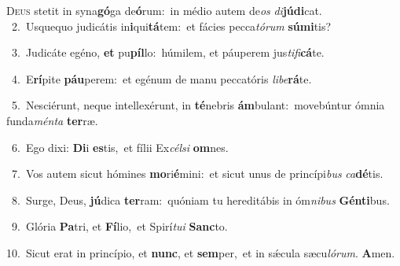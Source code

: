 \lettrine{\initial\textcolor{\initialcolor}{D}}{eus} stetit in syna\-\textbf{gó}\-ga de\-\textbf{ó}\-rum:~\star in médio autem de\textit{os} \textit{di}\-\textbf{jú}\textbf{di}cat.\\
{\numbfont\textcolor{\numbcolor}{~2.}}~Usquequo judicátis in\-\textbf{i}\-qui\-\textbf{tá}\-tem:~\star et fácies pecca\-\textit{tó}\-\textit{rum} \textbf{sú}\-\textbf{mi}tis?\par
{\numbfont\textcolor{\numbcolor}{~3.}}~Judicáte egéno, \textbf{et} pu\-\textbf{píl}\-lo:~\star húmilem, et páuperem jus\-\textit{ti}\-\textit{fi}\textbf{cá}te.\par
{\numbfont\textcolor{\numbcolor}{~4.}}~E\-\textbf{rí}\-pite \textbf{páu}\-perem:~\star et egénum de manu peccatóris \textit{li}\-\textit{be}\textbf{rá}te.\par
{\numbfont\textcolor{\numbcolor}{~5.}}~Nesciérunt, neque intellexérunt, in \textbf{té}\-nebris \textbf{ám}\-bulant:~\star movebúntur ómnia funda\-\textit{mén}\-\textit{ta} \textbf{ter}\-ræ.\par
{\numbfont\textcolor{\numbcolor}{~6.}}~Ego dixi: \textbf{Di}\-i \textbf{es}\-tis,~\star et fílii Ex\-\textit{cél}\-\textit{si} \textbf{om}\-nes.\par
{\numbfont\textcolor{\numbcolor}{~7.}}~Vos autem sicut hómines \textbf{mo}\-ri\-\textbf{é}\-mini:~\star et sicut unus de princípi\textit{bus} \textit{ca}\-\textbf{dé}tis.\par
{\numbfont\textcolor{\numbcolor}{~8.}}~Surge, Deus, \textbf{jú}\-dica \textbf{ter}\-ram:~\star quóniam tu hereditábis in óm\-\textit{ni}\-\textit{bus} \textbf{Gén}\-\textbf{ti}bus.\par
{\numbfont\textcolor{\numbcolor}{~9.}}~Glória \textbf{Pa}\-tri, et \textbf{Fí}\-lio,~\star et Spirí\-\textit{tu}\-\textit{i} \textbf{Sanc}\-to.\par
{\numbfont\textcolor{\numbcolor}{10.}}~Sicut erat in princípio, et \textbf{nunc}\-, et \textbf{sem}\-per,~\star et in sǽcula sæcu\-\textit{ló}\-\textit{rum}. \textbf{A}\-men.\par
